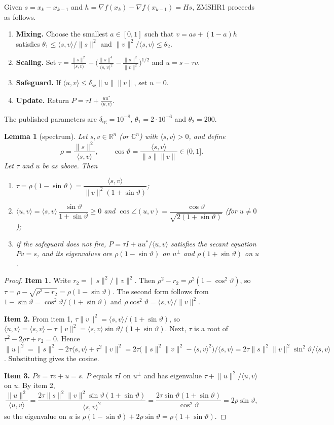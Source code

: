 \documentclass[11pt]{article}
\newtheorem{lemma}[theorem]{Lemma}
\theoremstyle{definition}
\theoremstyle{remark}
\newcommand{\RR}{\mathbb R}
\newcommand{\CC}{\mathbb C}
\newcommand{\inner}[2]{\langle #1,#2\rangle}
\newcommand{\norm}[1]{\lVert #1\rVert}
\newcommand{\dsg}{\delta_{\mathrm{sg}}}
\begin{document}
Given $s=x_k-x_{k-1}$ and $h=\nabla f(x_k)-\nabla f(x_{k-1})=Hs$, ZMSHR1 \cite[Alg.~2]{hong2024p2np} proceeds as follows.
\begin{enumerate}
\item \textbf{Mixing.} Choose the smallest $a\in[0,1]$ such that $v=as+(1-a)h$ satisfies
  $\theta_1\leq\inner sv/\norm s^2$ and $\norm v^2/\inner sv\leq\theta_2$.
\item \textbf{Scaling.} Set
  $\tau=\frac{\norm s^2}{\inner sv}-\big(\frac{\norm s^4}{\inner sv^2}-\frac{\norm s^2}{\norm v^2}\big)^{1/2}$
  and $u=s-\tau v$.
\item \textbf{Safeguard.} If $\inner uv\leq\dsg\norm u\norm v$, set $u=0$.
\item \textbf{Update.} Return $P=\tau I+\frac{uu^*}{\inner uv}$.
\end{enumerate}
The published parameters are $\dsg=10^{-8}$, $\theta_1=2\cdot10^{-6}$ and $\theta_2=200$.

\begin{lemma}[spectrum]\label{lem:spectrum}
Let $s,v\in\RR^n$ (or $\CC^n$) with $\inner sv>0$, and define
\[
\rho=\frac{\norm s^2}{\inner sv},\qquad \cos\vartheta=\frac{\inner sv}{\norm s\norm v}\in(0,1].
\]
Let $\tau$ and $u$ be as above. Then
\begin{enumerate}
\item $\tau=\rho(1-\sin\vartheta)=\dfrac{\inner sv}{\norm v^2(1+\sin\vartheta)}$;
\item $\inner uv=\inner sv\,\dfrac{\sin\vartheta}{1+\sin\vartheta}\geq0$ and
  $\cos\angle(u,v)=\dfrac{\cos\vartheta}{\sqrt{2(1+\sin\vartheta)}}$ (for $u\neq0$);
\item if the safeguard does not fire, $P=\tau I+uu^*/\inner uv$ satisfies the secant equation $Pv=s$, and its
  eigenvalues are $\rho(1-\sin\vartheta)$ on $u^\perp$ and $\rho(1+\sin\vartheta)$ on $u$.
\end{enumerate}
\end{lemma}
\begin{proof}
\textbf{Item 1.} Write $r_2=\norm s^2/\norm v^2$. Then $\rho^2-r_2=\rho^2(1-\cos^2\vartheta)$, so
$\tau=\rho-\sqrt{\rho^2-r_2}=\rho(1-\sin\vartheta)$. The second form follows from
$1-\sin\vartheta=\cos^2\vartheta/(1+\sin\vartheta)$ and $\rho\cos^2\vartheta=\inner sv/\norm v^2$.

\textbf{Item 2.} From item 1, $\tau\norm v^2=\inner sv/(1+\sin\vartheta)$, so
$\inner uv=\inner sv-\tau\norm v^2=\inner sv\sin\vartheta/(1+\sin\vartheta)$. Next, $\tau$ is a root of
$\tau^2-2\rho\tau+r_2=0$. Hence
$\norm u^2=\norm s^2-2\tau\inner sv+\tau^2\norm v^2=2\tau\big(\norm s^2\norm v^2-\inner sv^2\big)/\inner sv
=2\tau\norm s^2\norm v^2\sin^2\vartheta/\inner sv$. Substituting gives the cosine.

\textbf{Item 3.} $Pv=\tau v+u=s$. $P$ equals $\tau I$ on $u^\perp$ and has eigenvalue
$\tau+\norm u^2/\inner uv$ on $u$. By item 2,
\[
\frac{\norm u^2}{\inner uv}=\frac{2\tau\norm s^2\norm v^2\sin\vartheta(1+\sin\vartheta)}{\inner sv^2}
=\frac{2\tau\sin\vartheta(1+\sin\vartheta)}{\cos^2\vartheta}=2\rho\sin\vartheta,
\]
so the eigenvalue on $u$ is $\rho(1-\sin\vartheta)+2\rho\sin\vartheta=\rho(1+\sin\vartheta)$.
\end{proof}
\end{document}
